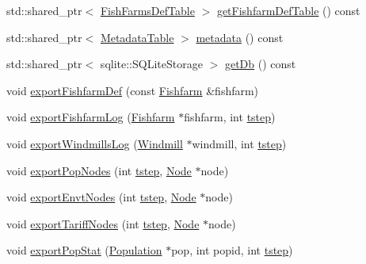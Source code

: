 \begin{DoxyCompactItemize}
\item 
std\+::shared\+\_\+ptr$<$ \mbox{\hyperlink{class_fish_farms_def_table}{Fish\+Farms\+Def\+Table}} $>$ \mbox{\hyperlink{class_s_q_lite_output_storage_a936436b2b0a76fa889c1193bc302c236}{get\+Fishfarm\+Def\+Table}} () const
\item 
std\+::shared\+\_\+ptr$<$ \mbox{\hyperlink{class_metadata_table}{Metadata\+Table}} $>$ \mbox{\hyperlink{class_s_q_lite_output_storage_a168924d56024d59c38f6ff7f383a92f2}{metadata}} () const
\item 
std\+::shared\+\_\+ptr$<$ sqlite\+::\+S\+Q\+Lite\+Storage $>$ \mbox{\hyperlink{class_s_q_lite_output_storage_a0a4e7c7bdbb73b59a28991657768aa79}{get\+Db}} () const
\item 
void \mbox{\hyperlink{class_s_q_lite_output_storage_a2731d3d98f84fa12e91dfb06061448b8}{export\+Fishfarm\+Def}} (const \mbox{\hyperlink{class_fishfarm}{Fishfarm}} \&fishfarm)
\item 
void \mbox{\hyperlink{class_s_q_lite_output_storage_a22848a682fdd77dac3444f07a75079f5}{export\+Fishfarm\+Log}} (\mbox{\hyperlink{class_fishfarm}{Fishfarm}} $\ast$fishfarm, int \mbox{\hyperlink{thread__vessels_8cpp_a84bc73d278de929ec9974e1a95d9b23a}{tstep}})
\item 
void \mbox{\hyperlink{class_s_q_lite_output_storage_a7d415c5a0459b81b43c47649d3f0d349}{export\+Windmills\+Log}} (\mbox{\hyperlink{class_windmill}{Windmill}} $\ast$windmill, int \mbox{\hyperlink{thread__vessels_8cpp_a84bc73d278de929ec9974e1a95d9b23a}{tstep}})
\item 
void \mbox{\hyperlink{class_s_q_lite_output_storage_a3800a1fa7ec6fd2a4d567ee45c839918}{export\+Pop\+Nodes}} (int \mbox{\hyperlink{thread__vessels_8cpp_a84bc73d278de929ec9974e1a95d9b23a}{tstep}}, \mbox{\hyperlink{class_node}{Node}} $\ast$node)
\item 
void \mbox{\hyperlink{class_s_q_lite_output_storage_ae344ba008d0b7d73c62a4bb57f643ec0}{export\+Envt\+Nodes}} (int \mbox{\hyperlink{thread__vessels_8cpp_a84bc73d278de929ec9974e1a95d9b23a}{tstep}}, \mbox{\hyperlink{class_node}{Node}} $\ast$node)
\item 
void \mbox{\hyperlink{class_s_q_lite_output_storage_a46e7b80c24e629cb8a8223e4a71a96d7}{export\+Tariff\+Nodes}} (int \mbox{\hyperlink{thread__vessels_8cpp_a84bc73d278de929ec9974e1a95d9b23a}{tstep}}, \mbox{\hyperlink{class_node}{Node}} $\ast$node)
\item 
void \mbox{\hyperlink{class_s_q_lite_output_storage_aee00c8202df05f6d084e21ebc93ea096}{export\+Pop\+Stat}} (\mbox{\hyperlink{class_population}{Population}} $\ast$pop, int popid, int \mbox{\hyperlink{thread__vessels_8cpp_a84bc73d278de929ec9974e1a95d9b23a}{tstep}})

\end{DoxyCompactItemize}
